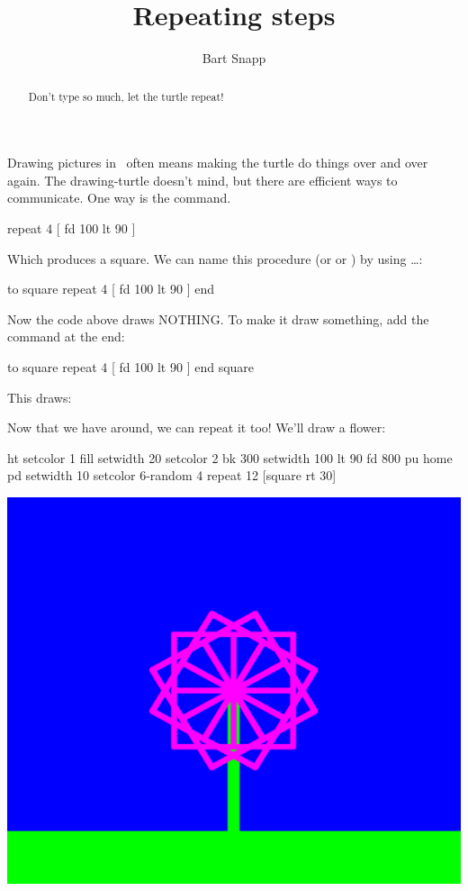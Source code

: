 \documentclass[noauthor,nooutcomes,12pt]{ximera}
\title{Repeating steps}
\author{Bart Snapp}
\begin{document}
\begin{abstract}
  Don't type so much, let the turtle repeat!
\end{abstract}
\maketitle

\nameblankgen

\begin{multicols*}{2}
  Drawing pictures in \LOGO\ often means making the turtle do things
  over and over again. The drawing-turtle doesn't mind, but there are
  efficient ways to communicate. One way is the  command.
\begin{logo}
repeat 4 [
  fd 100
  lt 90
  ]
\end{logo}

Which produces a square. We can name this procedure  (or
 or ) by using  \dots {}:

\begin{logo}
to square
  repeat 4 [ fd 100 lt 90 ]
end
\end{logo}
Now the code above draws NOTHING. To make it draw something, add the command  at the end:
\begin{logo}
to square
  repeat 4 [ fd 100 lt 90 ]
end
square  
\end{logo}
This draws:
\begin{logoout}
\end{logoout}

Now that we have  around, we can repeat it too! We'll draw a flower:

\begin{logo}
ht setcolor 1 fill 
setwidth 20 setcolor 2
bk 300
setwidth 100
lt 90 
fd 800
pu home pd
setwidth 10 setcolor 6-random 4
repeat 12 [square rt 30]
\end{logo}
\begin{logoout}
    \includegraphics[width=.3\textwidth]{flower.png}
\end{logoout}


\end{multicols*}
\end{document}
